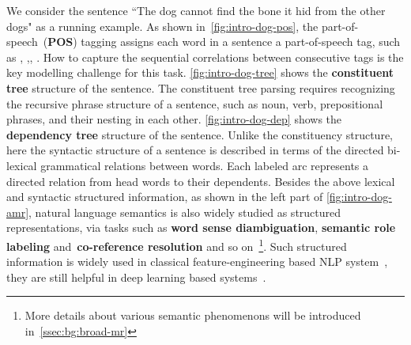 We consider the sentence ``The dog cannot find
the bone it hid from the other dogs" as a running example. As shown
in~\autoref{fig:intro-dog-pos}, the part-of-speech~(\textbf{POS})
tagging assigns each word in a sentence a part-of-speech tag, such as
, ,, . How to capture
the sequential correlations between consecutive tags is the key
modelling challenge for this task.  \autoref{fig:intro-dog-tree} shows
the \textbf{constituent tree} structure of the sentence. The
constituent tree parsing requires recognizing the recursive phrase
structure of a sentence, such as noun, verb, prepositional phrases,
and their nesting in each other. \autoref{fig:intro-dog-dep} shows the
\textbf{dependency tree} structure of the sentence. Unlike the
constituency structure, here the syntactic structure of a sentence is
described in terms of the directed bi-lexical grammatical relations
between words. Each labeled arc represents a directed relation from
head words to their dependents. Besides the above lexical and
syntactic structured information, as shown in the left part of
\autoref{fig:intro-dog-amr}, natural language semantics is also widely
studied as structured representations, via tasks such as \textbf{ word
  sense diambiguation}, \textbf{semantic role labeling}
and~\textbf{co-reference resolution} and so on~\footnote{More details
  about various semantic phenomenons will be introduced
  in~\autoref{ssec:bg:broad-mr}}. Such structured information is
widely used in classical feature-engineering based NLP
system~\citep[e.g.,][]{Joh:Nug:08,hovy2010s,punyakanok2008importance},
they are still helpful in deep learning based
systems~\citep{moosavi-strube-2018-using,strubell-etal-2018-linguistically,bowman-etal-2016-fast}.


